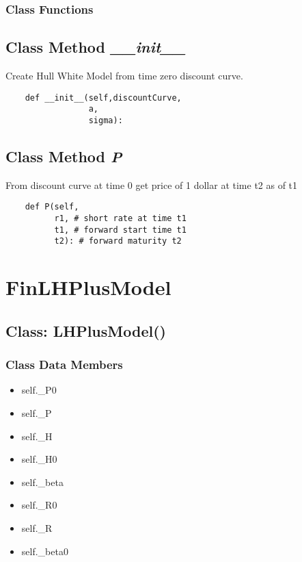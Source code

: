 \documentclass[twoside,11pt]{book}
\begin{document}
\subsubsection{Class Functions}

\subsection{Class Method {\it \_\_init\_\_}}
Create Hull White Model from time zero discount curve. 

\begin{lstlisting}
    def __init__(self,discountCurve,
                 a,
                 sigma):
\end{lstlisting}

\subsection{Class Method {\it P}}
From discount curve at time 0 get price of 1 dollar at time t2 as of t1 

\begin{lstlisting}
    def P(self,
          r1, # short rate at time t1
          t1, # forward start time t1
          t2): # forward maturity t2
\end{lstlisting}

\newpage
\section{FinLHPlusModel}

\subsection{Class: LHPlusModel()}


\subsubsection{Class Data Members}
\begin{itemize}
\item{self.\_P0}
\item{self.\_P}
\item{self.\_H}
\item{self.\_H0}
\item{self.\_beta}
\item{self.\_R0}
\item{self.\_R}
\item{self.\_beta0}
\end{itemize}
\end{document}
